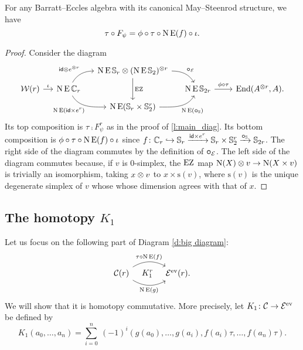 \begin{lemma}\label{l:K0}
	For any Barratt--Eccles algebra with its canonical May--Steenrod structure, we have
	\[
	\tau \mathbin{\circ} F_\psi = \phi \mathbin{\circ} \tau \mathbin{\circ} \operatorname{N}\operatorname{E}(f) \mathbin{\circ} \iota.
	\]
\end{lemma}

\begin{proof}
	Consider the diagram
	\[\label{d:F and f}
		\begin{tikzcd}[column sep=small,row sep=tiny]
			&& \chains\EE\sym_r \ot (\chains\EE\sym_2)^{\ot r}
			\arrow[dr,"\bcomp_{\BE}",out=0,in=120]
			\arrow[dd,"\EZ"] &&[10pt] \\
			\cW(r) \arrow[r,"\iota"] &
			\chains\EE\cyc_r
			\arrow[ur,"\id \ot e^{\ot r}", out=60,in=180]
			\arrow[dr,"\chains\EE(\id \times e^r)"',out=-60,in=180]
			& & \chains\EE\sym_{2r} \arrow[r,"\phi\comp\tau"] &
			\End(A^{\ot r}, A). \\
			&& \chains\EE(\sym_r \times \sym_2^r)
			\arrow[ur, "\chains\EE(\bcomp_{\sym})"', out=0,in=-120]
			&
		\end{tikzcd}
	\]
	Its top composition is $\tau \comp F_\psi^r$ as in the proof of \cref{l:main_diag}.
	Its bottom composition is $\phi \mathbin{\circ} \tau \mathbin{\circ} \operatorname{N}\operatorname{E}(f) \mathbin{\circ} \iota$ since $f \colon \mathbb{C}_r \hookrightarrow \mathbb{S}_r \xrightarrow{\mathsf{id} \times e^r} \mathbb{S}_r \times \mathbb{S}_2^r \xrightarrow{\bm{\mathbin{\circ}}_{\mathbb{S}}} \mathbb{S}_{2r}$.
	The right side of the diagram commutes by the definition of $\bm{\mathbin{\circ}}_{\mathcal{E}}$.
	The left side of the diagram commutes because, if $v$ is $0$-simplex, the $\operatorname{EZ}$ map $\operatorname{N}(X) \otimes v \to \operatorname{N}(X \times v)$ is trivially an isomorphism, taking $x \otimes v$ to $x \times \mathrm{s}(v)$, where $\mathrm{s}(v)$ is the unique degenerate simplex of $v$ whose whose dimension agrees with that of $x$.
\end{proof}

\subsection{The homotopy $K_1$}\label{ss:K1}

Let us focus on the following part of Diagram \eqref{d:big diagram}:
\[
\begin{tikzcd}[column sep=large]
	\cC(r)
	\arrow[r,bend left,"\tau \comp \chains\EE(f)"]
	\arrow[r,bend right,"\chains\EE(g)"']
	\arrow[r,phantom,"K_1^r"]
	& \BE^\ev(r).
\end{tikzcd}
\]
We will show that it is homotopy commutative.
More precisely, let $K_1 \colon \mathcal{C} \to \mathcal{E}^{\mathrm{ev}}$ be defined by
\[
K_1(a_0,\dots,a_n) =
\sum_{i=0}^n \ (-1)^i (g(a_0), \dots, g(a_i), f(a_i) \tau, \dots, f(a_n) \tau).
\]

